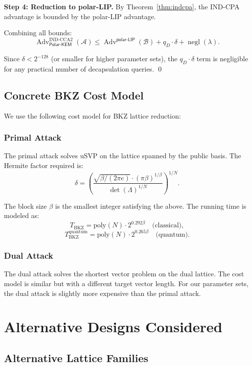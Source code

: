\documentclass[11pt,a4paper]{article}
\newcommand{\polarKem}{\textsf{Polar-KEM}\xspace}
\newcommand{\usvp}{\textsf{uSVP}\xspace}
\newcommand{\polarLIP}{\textsf{polar-LIP}\xspace}
\newcommand{\INDCPA}{\textsf{IND-CPA}\xspace}
\DeclareMathOperator{\negl}{negl}
\DeclareMathOperator{\Adv}{Adv}
\begin{document}
\textbf{Step 4: Reduction to polar-LIP.} By Theorem~\ref{thm:indcpa}, the \INDCPA advantage is bounded by the \polarLIP advantage.

Combining all bounds:
\[
\Adv_{\polarKem}^{\text{IND-CCA2}}(\mathcal{A}) \leq \Adv^{\polarLIP}(\mathcal{B}) + q_D \cdot \delta + \negl(\lambda).
\]

Since $\delta < 2^{-128}$ (or smaller for higher parameter sets), the $q_D \cdot \delta$ term is negligible for any practical number of decapsulation queries. \qed

\subsection{Concrete BKZ Cost Model}\label{app:bkz-cost}

We use the following cost model for BKZ lattice reduction:

\subsubsection{Primal Attack}

The primal attack solves \usvp on the lattice spanned by the public basis. The Hermite factor required is:
\[
\delta = \left(\frac{\sqrt{\beta / (2\pi e)} \cdot (\pi \beta)^{1/\beta}}{\det(\Lambda)^{1/N}}\right)^{1/N}.
\]

The block size $\beta$ is the smallest integer satisfying the above. The running time is modeled as:
\[
T_{\text{BKZ}} = \text{poly}(N) \cdot 2^{0.292 \beta} \quad \text{(classical)},
\]
\[
T_{\text{BKZ}}^{\text{quantum}} = \text{poly}(N) \cdot 2^{0.265 \beta} \quad \text{(quantum)}.
\]

\subsubsection{Dual Attack}

The dual attack solves the shortest vector problem on the dual lattice. The cost model is similar but with a different target vector length. For our parameter sets, the dual attack is slightly more expensive than the primal attack.

\section{Alternative Designs Considered}\label{app:alternatives}

\subsection{Alternative Lattice Families}
\end{document}
